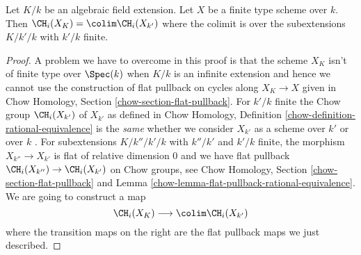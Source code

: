 \begin{lemma}
\label{lemma-chow-limit}
Let $K/k$ be an algebraic field extension. Let $X$ be a finite type
scheme over $k$. Then $\CH_i(X_K) = \colim \CH_i(X_{k'})$ where the
colimit is over the subextensions $K/k'/k$ with $k'/k$ finite.
\end{lemma}

\begin{proof}
A problem we have to overcome in this proof is that the scheme $X_K$
isn't of finite type over $\Spec(k)$ when $K/k$ is an infinite extension
and hence we cannot use the construction of flat pullback on cycles along
$X_K \to X$ given in Chow Homology, Section \ref{chow-section-flat-pullback}.
For $k'/k$ finite the Chow group $\CH_i(X_{k'})$ of $X_{k'}$
as defined in
Chow Homology, Definition \ref{chow-definition-rational-equivalence}
is the {\it same} whether we consider $X_{k'}$ as
a scheme over $k'$ or over $k$ .
For subextensions $K/k''/k'/k$ with $k''/k'$ and $k'/k$ finite,
the morphism $X_{k''} \to X_{k'}$ is flat of relative dimension $0$
and we have flat pullback $\CH_i(X_{k''}) \to \CH_i(X_{k'})$
on Chow groups, see
Chow Homology, Section \ref{chow-section-flat-pullback} and
Lemma \ref{chow-lemma-flat-pullback-rational-equivalence}.
We are going to construct a map
$$
\CH_i(X_K) \longrightarrow \colim \CH_i(X_{k'})
$$
where the transition maps on the right are the flat pullback maps
we just described.


\end{proof}
